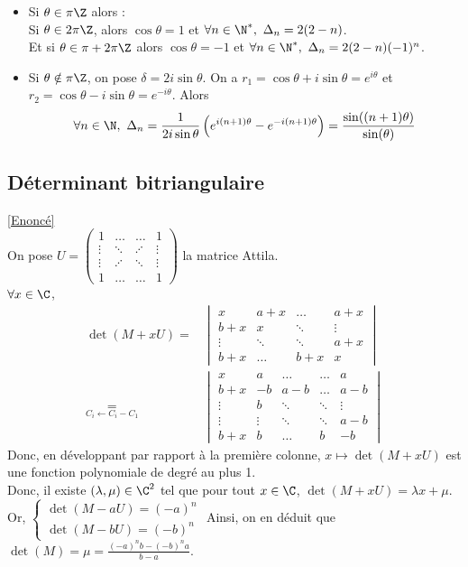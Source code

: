 \documentclass[8pt]{book}
\begin{document}
\begin{enumerate}[leftmargin=*]
		\begin{itemize}
			\item Si $\theta\in \pi\Z$ alors :\\
			Si $\theta\in2\pi\Z$, alors $\cos\theta=1$ et $\forall n\in \N^*,\ \Delta_n=2(2-n)$.\\
			Et si $\theta\in\pi+2\pi\Z$ alors $\cos\theta=-1$ et $\forall n\in \N^*,\ \Delta_n=2(2-n)(-1)^n$.
			\item Si $\theta\notin \pi\Z$, on pose $\delta=2i\sin\theta$. On a $r_1=\cos\theta+i\sin\theta=e^{i\theta}$ et $r_2=\cos\theta-i\sin\theta=e^{-i\theta}$. Alors
			$$\forall n\in \N,\ \Delta_n=\frac{1}{2i\sin\theta}\left(e^{i(n+1)\theta}-e^{-i(n+1)\theta}\right)=\frac{\sin((n+1)\theta)}{\sin(\theta)}$$
		\end{itemize}
	\end{enumerate}
	
	\subsection{Déterminant bitriangulaire}
	\label{Déterminant bitriangulaire corrigé}
	\textcolor{blue}{\hyperref[Déterminant bitriangulaire]{[Enoncé]}}\\
	On pose $U=\begin{pmatrix}
		1&\dots&\dots&1\\
		\vdots&\ddots&\adots&\vdots\\
		\vdots&\adots&\ddots&\vdots\\
		1&\dots&\dots&1
	\end{pmatrix}$ la matrice Attila.
	\\ $\forall x\in\C$,\begin{align*}
		\det(M+xU)=&\begin{vmatrix}
			x&a+x&\dots&a+x\\
			b+x&x&\ddots&\vdots\\
			\vdots&\ddots&\ddots&a+x\\
			b+x&\dots&b+x&x
		\end{vmatrix}\\
		\underset{C_i\leftarrow C_i-C_1}{=}&\begin{vmatrix}
			x &a&\dots&\dots &a\\
			b+x&-b&a-b&\dots&a-b\\
			\vdots &b &\ddots&\ddots&\vdots\\
			\vdots &\vdots&\ddots&\ddots&a-b\\
			b+x&b&\dots&b&-b
		\end{vmatrix}
	\end{align*}
	Donc, en développant par rapport à la première colonne, $x\mapsto\det(M+xU)$ est une fonction polynomiale de degré au plus 1.
	\\Donc, il existe $(\lambda,\mu)\in\C^2$ tel que pour tout $x\in\C$, $\det(M+xU)=\lambda x+\mu$.
	\\Or, $\begin{cases}
		\det(M-aU)=(-a)^n\\
		\det(M-bU)=(-b)^n
	\end{cases}$
	Ainsi, on en déduit que $\det(M)=\mu=\displaystyle\frac{(-a)^nb-(-b)^na}{b-a}$.
	
\end{document}
